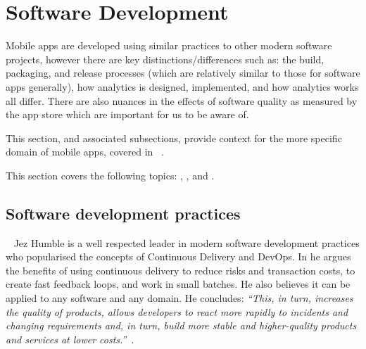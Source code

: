 \section{Software Development}

Mobile apps are developed using similar practices to other modern software projects, however there are key distinctions/differences such as: the build, packaging, and release processes (which are relatively similar to those for software apps generally), how analytics is designed, implemented, and how analytics works all differ. There are also nuances in the effects of software quality as measured by the app store which are important for us to be aware of.

This section, and associated subsections, provide context for the more specific domain of mobile apps, covered in ~.
 
This section covers the following topics: , , and .

\subsection{Software development practices}~\label{rw-software-development-practices-topic}
Jez Humble is a well respected leader in modern software development practices who popularised the concepts of Continuous Delivery and DevOps. In  he argues the benefits of using continuous delivery to reduce risks and transaction costs, to create fast feedback loops, and work in small batches. He also believes it can be applied to any software and any domain. He concludes: \emph{``This, in turn, increases the quality of products, allows developers to react more rapidly to incidents and changing requirements and, in turn, build more stable and higher-quality products and services at lower costs.''}~. 

